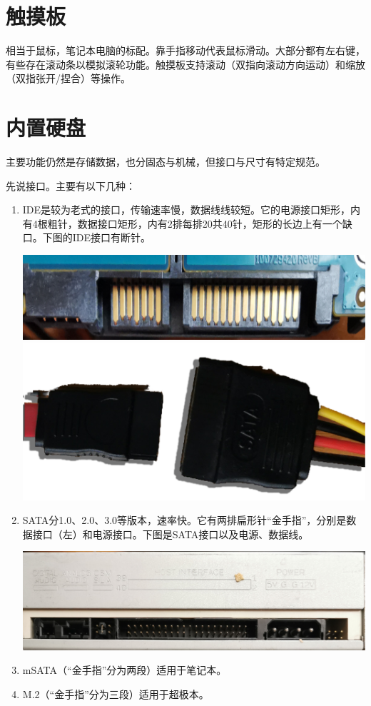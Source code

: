 \section{触摸板}
相当于鼠标，笔记本电脑的标配。靠手指移动代表鼠标滑动。大部分都有左右键，有些存在滚动条以模拟滚轮功能。触摸板支持滚动（双指向滚动方向运动）和缩放（双指张开/捏合）等操作。
\section{内置硬盘}
主要功能仍然是存储数据，也分固态与机械，但接口与尺寸有特定规范。\par
先说接口。主要有以下几种：
\begin{enumerate}
	\item IDE是较为老式的接口，传输速率慢，数据线线较短。它的电源接口矩形，内有4根粗针，数据接口矩形，内有2排每排20共40针，矩形的长边上有一个缺口。下图的IDE接口有断针。
	\begin{center}
		\includegraphics[width=0.7\linewidth]{pic/sata}\\\includegraphics[width=0.7\linewidth]{pic/SATA-Lines}	
	\end{center}
	\item SATA分1.0、2.0、3.0等版本，速率快。它有两排扁形针“金手指”，分别是数据接口（左）和电源接口。下图是SATA接口以及电源、数据线。
	\begin{center}
		\includegraphics[width=0.7\linewidth]{pic/IDE}
	\end{center}
	\item mSATA（“金手指”分为两段）适用于笔记本。
	\item M.2（“金手指”分为三段）适用于超极本。
\end{enumerate}
